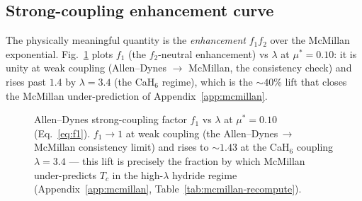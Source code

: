 \subsection{Strong-coupling enhancement curve}
\label{app:ad-enhance}

The physically meaningful quantity is the \emph{enhancement} $f_1 f_2$
over the McMillan exponential. Fig.~\ref{fig:ad-enhance} plots $f_1$ (the
$f_2$-neutral enhancement) vs $\lambda$ at $\mu^{*}=0.10$: it is unity at
weak coupling (Allen--Dynes $\to$ McMillan, the consistency check) and
rises past $1.4$ by $\lambda=3.4$ (the CaH$_6$ regime), which is the
$\sim\!40$\% lift that closes the McMillan under-prediction of
Appendix~\ref{app:mcmillan}.

\begin{figure}[h]
\centering
{}
\caption{Allen--Dynes strong-coupling factor $f_1$ vs $\lambda$ at
$\mu^{*}=0.10$ (Eq.~\ref{eq:f1}). $f_1\!\to\!1$ at weak coupling (the
Allen--Dynes\,$\to$\,McMillan consistency limit) and rises to $\sim\!1.43$
at the CaH$_6$ coupling $\lambda=3.4$ --- this lift is precisely the
fraction by which McMillan under-predicts $T_c$ in the high-$\lambda$
hydride regime (Appendix~\ref{app:mcmillan}, Table~\ref{tab:mcmillan-recompute}).}
\label{fig:ad-enhance}
\end{figure}


